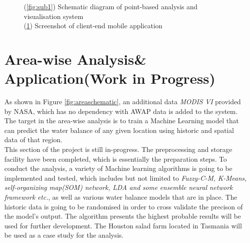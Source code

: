 \documentclass[12pt,journal,compsoc,onecolumn]{IEEEtran}
\begin{document}
\begin{figure}[H]
\begin{subfigure}{.3\textwidth}
  \caption{}
  \label{fig:sub2}
\end{subfigure}
\caption{(\ref{fig:sub1}) Schematic diagram of point-based analysis and visualisation system\\ (\ref{fig:sub2}) Screenshot of client-end mobile application}
\label{fig:pointschematic}
\end{figure}
\section{Area-wise Analysis\& Application(Work in Progress)}
As shown in Figure \ref{fig:areaschematic}, an additional data \emph{MODIS VI} provided by NASA, which has no dependency with AWAP data is added to the system. The target in the area-wise analysis is to train a Machine Learning model that can predict the water balance of any given location using historic and spatial data of that region.\\
\newline
This section of the project is still in-progress. The preprocessing and storage facility have been completed, which is essentially the preparation steps. To conduct the analysis, a variety of Machine learning algorithms is going to be implemented and tested, which includes but not limited to \emph{Fuzzy-C-M, K-Means,  self-organizing map(SOM) network, LDA and some ensemble neural network framework etc.}, as well as various water balance models that are in place. The historic data is going to be randomised in order to cross validate the precison of the model's output. The algorithm presents the highest probable results will be used for further development. The Houston salad farm located in Tasmania will be used as a case study for the analysis.
\end{document}
